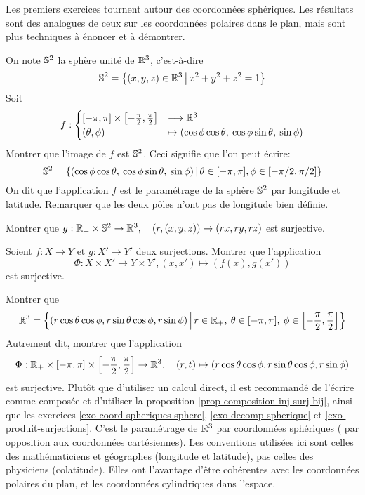 Les premiers exercices tournent autour des coordonnées sphériques. Les résultats sont des analogues de ceux sur les coordonnées polaires dans le plan, mais sont plus techniques à énoncer et à démontrer.


\begin{exercice}\label{exo-coord-spheriques-sphere}
On note $\S^2$ la sphère unité de $\R^3$, c'est-à-dire 
\[ \S^2 = \ensemble{(x,y,z)\in\R^3}{x^2+y^2+z^2=1}\]
Soit 
\[ f : 
\begin{cases}
 [-\pi,\pi] \times \left[-\frac{\pi}{2},\frac{\pi}{2}\right] &\longrightarrow \R^3\\
(\theta,\phi) &\mapsto (\cos\phi\cos\theta,\: \cos\phi\sin\theta, \: \sin\phi)
\end{cases}
\]
Montrer que l'image de $f$ est $\S^2$. Ceci signifie que l'on peut écrire:
\[ \S^2 = \ensemble{(\cos\phi\cos\theta,\: \cos\phi\sin\theta, \: \sin\phi)}{\theta\in [-\pi,\pi], \phi\in [-\pi/2,\pi/2]}
\]
On dit que l'application $f$ est le paramétrage de la sphère $\S^2$ par longitude et latitude. Remarquer que les deux pôles n'ont pas de longitude bien définie.
\end{exercice}

\begin{exercice}\label{exo-decomp-spherique}
Montrer que $g : \R_+\times \S^2 \to \R^3, \quad (r,(x,y,z))\mapsto (rx,ry,rz)$ est surjective.
\end{exercice}

\begin{exercice}\label{exo-produit-surjections}
Soient $f:X\to Y$ et $g:X'\to Y'$ deux surjections. Montrer que l'application
\[ 
\Phi : X\times X' \to Y\times Y', (x,x') \mapsto (f(x),g(x'))
\]
est surjective.
\end{exercice}


\begin{exercice}\label{exo-coord-spheriques-espace}
Montrer que 
\[ \R^3 = \ensemble{(r\cos\theta\cos\phi, r\sin\theta\cos\phi, r\sin\phi)}{r\in\R_+, \: \theta \in [-\pi,\pi], \: \phi\in\left[-\frac{\pi}{2},\frac{\pi}{2}\right]}\]
Autrement dit, montrer que l'application 
\[\Phi : \R_+\times [-\pi,\pi]\times \left[-\frac{\pi}{2},\frac{\pi}{2}\right] \to \R^3, \quad 
(r,t) \mapsto (r\cos\theta\cos\phi, r\sin\theta\cos\phi, r\sin\phi)
\]
est surjective. Plutôt que d'utiliser un calcul direct, il est recommandé de l'écrire comme composée et d'utiliser la proposition \ref{prop-composition-inj-surj-bij}, ainsi que les exercices \ref{exo-coord-spheriques-sphere}, \ref{exo-decomp-spherique}  et \ref{exo-produit-surjections}.
C'est le paramétrage de $\R^3$ par coordonnées sphériques  ( par opposition aux coordonnées cartésiennes). Les conventions utilisées ici sont celles des mathématiciens et géographes (longitude et latitude), pas celles des physiciens (colatitude). Elles ont l'avantage d'être cohérentes avec les coordonnées polaires du plan, et les coordonnées cylindriques dans l'espace.
\end{exercice}

